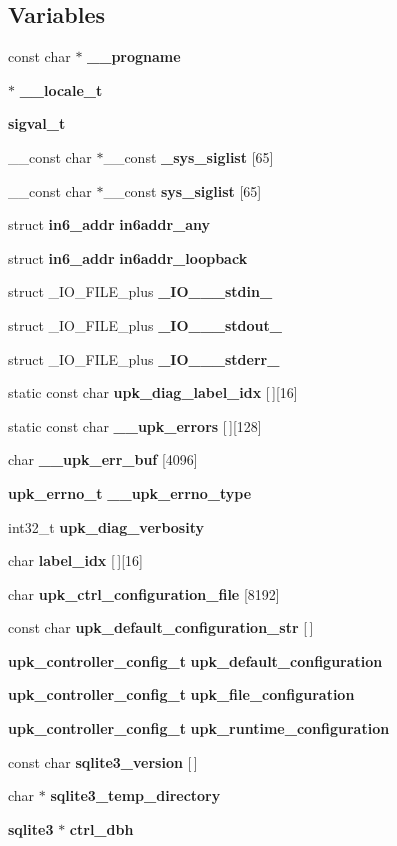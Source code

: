 \subsection*{Variables}
\begin{DoxyCompactItemize}
\item 
const char $\ast$ {\bf \_\-\_\-progname}
\item 
$\ast$ {\bf \_\-\_\-locale\_\-t}
\item 
{\bf sigval\_\-t}
\item 
\_\-\_\-const char $\ast$\_\-\_\-const {\bf \_\-sys\_\-siglist} [65]
\item 
\_\-\_\-const char $\ast$\_\-\_\-const {\bf sys\_\-siglist} [65]
\item 
struct {\bf in6\_\-addr} {\bf in6addr\_\-any}
\item 
struct {\bf in6\_\-addr} {\bf in6addr\_\-loopback}
\item 
struct \_\-IO\_\-FILE\_\-plus {\bf \_\-IO\_\_\_\-stdin\_\-}
\item 
struct \_\-IO\_\-FILE\_\-plus {\bf \_\-IO\_\_\_\-stdout\_\-}
\item 
struct \_\-IO\_\-FILE\_\-plus {\bf \_\-IO\_\_\_\-stderr\_\-}
\item 
static const char {\bf upk\_\-diag\_\-label\_\-idx} [$\,$][16]
\item 
static const char {\bf \_\-\_\-upk\_\-errors} [$\,$][128]
\item 
char {\bf \_\-\_\-upk\_\-err\_\-buf} [4096]
\item 
{\bf upk\_\-errno\_\-t} {\bf \_\-\_\-upk\_\-errno\_\-type}
\item 
int32\_\-t {\bf upk\_\-diag\_\-verbosity}
\item 
char {\bf label\_\-idx} [$\,$][16]
\item 
char {\bf upk\_\-ctrl\_\-configuration\_\-file} [8192]
\item 
const char {\bf upk\_\-default\_\-configuration\_\-str} [$\,$]
\item 
{\bf upk\_\-controller\_\-config\_\-t} {\bf upk\_\-default\_\-configuration}
\item 
{\bf upk\_\-controller\_\-config\_\-t} {\bf upk\_\-file\_\-configuration}
\item 
{\bf upk\_\-controller\_\-config\_\-t} {\bf upk\_\-runtime\_\-configuration}
\item 
const char {\bf sqlite3\_\-version} [$\,$]
\item 
char $\ast$ {\bf sqlite3\_\-temp\_\-directory}
\item 
{\bf sqlite3} $\ast$ {\bf ctrl\_\-dbh}
\end{DoxyCompactItemize}


